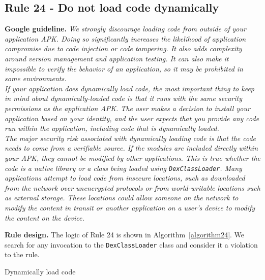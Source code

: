 \subsection{Rule 24 - Do not load code dynamically} 
\textbf{Google guideline.} \emph{We strongly discourage loading code from outside of your application APK. Doing so significantly increases the likelihood of application compromise due to code injection or code tampering. It also adds complexity around version management and application testing. It can also make it impossible to verify the behavior of an application, so it may be prohibited in some environments.
\\
If your application does dynamically load code, the most important thing to keep in mind about dynamically-loaded code is that it runs with the same security permissions as the application APK. The user makes a decision to install your application based on your identity, and the user expects that you provide any code run within the application, including code that is dynamically loaded.
\\
The major security risk associated with dynamically loading code is that the code needs to come from a verifiable source. If the modules are included directly within your APK, they cannot be modified by other applications. This is true whether the code is a native library or a class being loaded using \texttt{DexClassLoader}. Many applications attempt to load code from insecure locations, such as downloaded from the network over unencrypted protocols or from world-writable locations such as external storage. These locations could allow someone on the network to modify the content in transit or another application on a user's device to modify the content on the device.}

\textbf{Rule design.} The logic of Rule 24 is shown in Algorithm~\ref{algorithm24}. We search for any invocation to the \texttt{DexClassLoader} class and consider it a violation to the rule. 

\setcounter{algocf}{23}
\begin{algorithm}[]
\SetAlgoLined
{}
\caption{Dynamically load code}
\label{algorithm24}
\end{algorithm}

